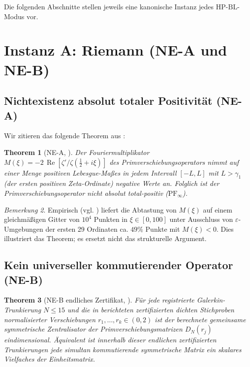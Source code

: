 \documentclass[11pt]{article}
\newtheorem{theorem}{Theorem}[section]
\theoremstyle{definition}
\theoremstyle{remark}
\newtheorem{remark}[theorem]{Bemerkung}
\newcommand{\HBL}{\mathrm{HP\text{-}BL}}
\renewcommand{\Re}{\operatorname{Re}}
\newcommand{\halfline}{\tfrac{1}{2}}
\begin{document}
Die folgenden Abschnitte stellen jeweils eine kanonische Instanz jedes
$\HBL$-Modus vor.

\section{Instanz A: Riemann (NE-A und NE-B)}
\label{sec:riemann}

\subsection{Nichtexistenz absolut totaler Positivität (NE-A)}
\label{sec:ne-a}

Wir zitieren das folgende Theorem aus \cite{Geiger2026RHII}:

\begin{theorem}[NE-A, {\cite[Thm.~NE-A]{Geiger2026RHII}}]\label{thm:NE-A}
Der Fouriermultiplikator
$M(\xi) = -2\,\Re[\zeta'/\zeta(\halfline + i\xi)]$
des Primverschiebungsoperators nimmt auf einer Menge positiven Lebesgue-Maßes
in jedem Intervall $[-L, L]$ mit $L > \gamma_1$ (der ersten positiven Zeta-Ordinate)
negative Werte an. Folglich ist der Primverschiebungsoperator
nicht absolut total-positiv ($\mathrm{PF}_\infty$).
\end{theorem}

\begin{remark}\label{rem:ne-a-empirical}
Empirisch (vgl. \cite[\S4.2]{Geiger2026RHII}) liefert die Abtastung von $M(\xi)$
auf einem gleichmäßigen Gitter von $10^4$ Punkten in $\xi \in [0,100]$ unter Ausschluss
von $\varepsilon$-Umgebungen der ersten 29 Ordinaten ca. $49\%$ Punkte mit $M(\xi) < 0$.
Dies illustriert das Theorem; es ersetzt nicht das strukturelle Argument.
\end{remark}

\subsection{Kein universeller kommutierender Operator (NE-B)}
\label{sec:ne-b}

\begin{theorem}[NE-B endliches Zertifikat, {\cite[Thm.~NE-B]{Geiger2026RHII}}]\label{thm:NE-B}
Für jede registrierte Galerkin-Trunkierung $N \leq 15$ und die in
\cite{Geiger2026RHII} berichteten zertifizierten dichten Stichproben
normalisierter Verschiebungen $r_1, \ldots, r_k \in (0,2)$ ist der
berechnete gemeinsame symmetrische Zentralisator der
Primverschiebungsmatrizen $D_N(r_j)$ eindimensional. Äquivalent ist
innerhalb dieser endlichen zertifizierten Trunkierungen jede simultan
kommutierende symmetrische Matrix ein skalares Vielfaches der
Einheitsmatrix.
\end{theorem}
\end{document}
